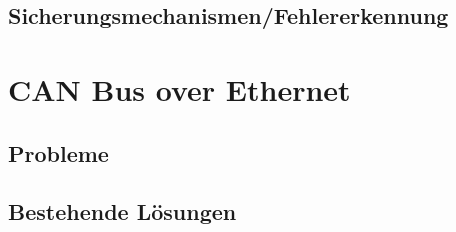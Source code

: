 	\subsection{Sicherungsmechanismen/Fehlererkennung}

\section{CAN Bus over Ethernet}
	
	\subsection{Probleme}
	
	\subsection{Bestehende Lösungen}



\newpage {} \listoffigures

\newpage {}
 
%

